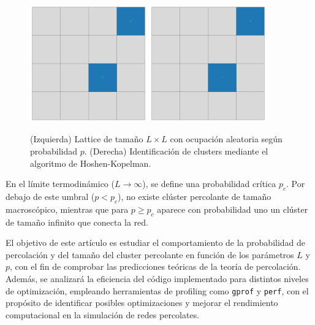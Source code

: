 \documentclass{article}
\begin{document}
\begin{figure}[ht]
    \centering
    \includegraphics[width=0.45\textwidth]{figures/lattice.pdf}
    \hfill
    \includegraphics[width=0.45\textwidth]{figures/clusters.pdf}
    \caption{(Izquierda) Lattice de tamaño \( L \times L \) con ocupación aleatoria según probabilidad \( p \). (Derecha) Identificación de clusters mediante el algoritmo de Hoshen-Kopelman.}
    \label{fig:lattice_clusters}
\end{figure}
En el límite termodinámico (\(L \to \infty\)), se define una probabilidad crítica \(p_{c}\). Por debajo de este umbral (\(p < p_{c}\)), no existe clúster percolante de tamaño macroscópico, mientras que para \(p \ge p_{c}\) aparece con probabilidad uno un clúster de tamaño infinito que conecta la red.

El objetivo de este artículo es estudiar el comportamiento de la probabilidad de percolación y del tamaño del cluster percolante en función de los parámetros \(L\) y \(p\), con el fin de comprobar las predicciones teóricas de la teoría de percolación. Además, se analizará la eficiencia del código implementado para distintos niveles de optimización, empleando herramientas de profiling como \texttt{gprof} y \texttt{perf}, con el propósito de identificar posibles optimizaciones y mejorar el rendimiento computacional en la simulación de redes percolates.
\end{document}
